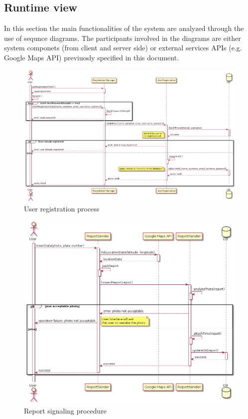 \subsection{Runtime view}
In this section the main functionalities of the system are analyzed through the use of sequnce diagrams. The participants involved in the diagrams are either system componets (from client and server side) or external services APIs (e.g. Google Maps API) previuosly specified in this document.

\begin{figure}[H]
	\centering
	\includegraphics[width=\textwidth]{Images/seqDiag_userReg}
	\caption{User registration process}
\end{figure}
	\newpage

\begin{figure}[H]
	\centering
	\includegraphics[width=\textwidth]{Images/seqDiag_ReportSignal}
	\caption{Report signaling procedure}
\end{figure}
	\newpage	
	
